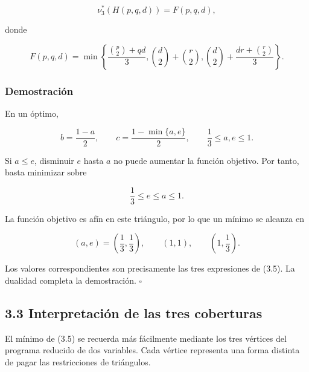 \documentclass[
  11pt,
]{article}
\begin{document}
\[
\boxed{
\nu_3^*(H(p,q,d))
=
F(p,q,d),
}
\tag{3.4}
\]

donde

\[
\boxed{
F(p,q,d)
=
\min\left\{
\frac{\binom p2+qd}{3},
\binom d2+\binom r2,
\binom d2+\frac{dr+\binom r2}{3}
\right\}.
}
\tag{3.5}
\]

\subsubsection{Demostración}\label{demostraciuxf3n}

En un óptimo,

\[
b=\frac{1-a}{2},
\qquad
c=\frac{1-\min\{a,e\}}2,
\qquad
\frac13\le a,e\le1.
\]

Si \(a\le e\), disminuir \(e\) hasta \(a\) no puede aumentar la función
objetivo. Por tanto, basta minimizar sobre

\[
\frac13\le e\le a\le1.
\]

La función objetivo es afín en este triángulo, por lo que un mínimo se
alcanza en

\[
(a,e)=\left(\frac13,\frac13\right),
\qquad
(1,1),
\qquad
\left(1,\frac13\right).
\]

Los valores correspondientes son precisamente las tres expresiones de
(3.5). La dualidad completa la demostración. \(\square\)

\subsection{3.3 Interpretación de las tres
coberturas}\label{interpretaciuxf3n-de-las-tres-coberturas}

El mínimo de (3.5) se recuerda más fácilmente mediante los tres vértices
del programa reducido de dos variables. Cada vértice representa una
forma distinta de pagar las restricciones de triángulos.
\end{document}
